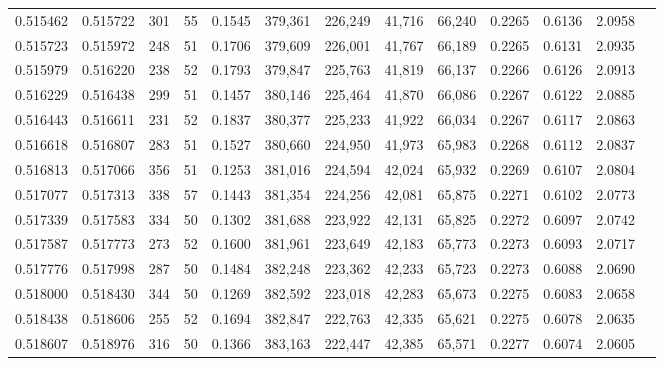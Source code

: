 \begin{tabular}{rrrrrrrrrrrrr}
0.515462 & 0.515722 &   301 &  55 &                                     0.1545 & 379,361 & 226,249 &  41,716 &  66,240 & 0.2265 & 0.6136 & 2.0958 \\
0.515723 & 0.515972 &   248 &  51 &                                     0.1706 & 379,609 & 226,001 &  41,767 &  66,189 & 0.2265 & 0.6131 & 2.0935 \\
0.515979 & 0.516220 &   238 &  52 &                                     0.1793 & 379,847 & 225,763 &  41,819 &  66,137 & 0.2266 & 0.6126 & 2.0913 \\
0.516229 & 0.516438 &   299 &  51 &                                     0.1457 & 380,146 & 225,464 &  41,870 &  66,086 & 0.2267 & 0.6122 & 2.0885 \\
0.516443 & 0.516611 &   231 &  52 &                                     0.1837 & 380,377 & 225,233 &  41,922 &  66,034 & 0.2267 & 0.6117 & 2.0863 \\
0.516618 & 0.516807 &   283 &  51 &                                     0.1527 & 380,660 & 224,950 &  41,973 &  65,983 & 0.2268 & 0.6112 & 2.0837 \\
0.516813 & 0.517066 &   356 &  51 &                                     0.1253 & 381,016 & 224,594 &  42,024 &  65,932 & 0.2269 & 0.6107 & 2.0804 \\
0.517077 & 0.517313 &   338 &  57 &                                     0.1443 & 381,354 & 224,256 &  42,081 &  65,875 & 0.2271 & 0.6102 & 2.0773 \\
0.517339 & 0.517583 &   334 &  50 &                                     0.1302 & 381,688 & 223,922 &  42,131 &  65,825 & 0.2272 & 0.6097 & 2.0742 \\
0.517587 & 0.517773 &   273 &  52 &                                     0.1600 & 381,961 & 223,649 &  42,183 &  65,773 & 0.2273 & 0.6093 & 2.0717 \\
0.517776 & 0.517998 &   287 &  50 &                                     0.1484 & 382,248 & 223,362 &  42,233 &  65,723 & 0.2273 & 0.6088 & 2.0690 \\
0.518000 & 0.518430 &   344 &  50 &                                     0.1269 & 382,592 & 223,018 &  42,283 &  65,673 & 0.2275 & 0.6083 & 2.0658 \\
0.518438 & 0.518606 &   255 &  52 &                                     0.1694 & 382,847 & 222,763 &  42,335 &  65,621 & 0.2275 & 0.6078 & 2.0635 \\
0.518607 & 0.518976 &   316 &  50 &                                     0.1366 & 383,163 & 222,447 &  42,385 &  65,571 & 0.2277 & 0.6074 & 2.0605 \\

\end{tabular}
